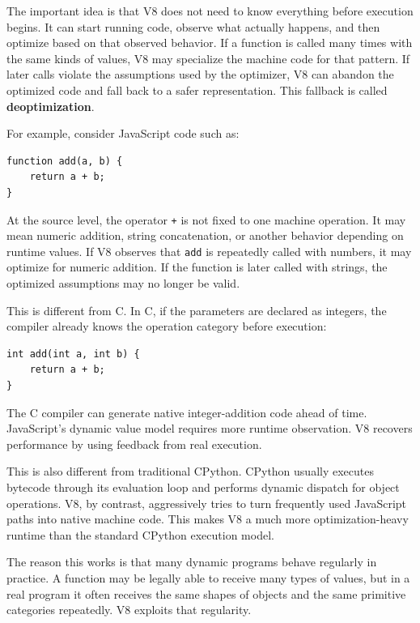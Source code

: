 The important idea is that V8 does not need to know everything before execution begins. It can start running code, observe what actually happens, and then optimize based on that observed behavior. If a function is called many times with the same kinds of values, V8 may specialize the machine code for that pattern. If later calls violate the assumptions used by the optimizer, V8 can abandon the optimized code and fall back to a safer representation. This fallback is called \textbf{deoptimization}.

For example, consider JavaScript code such as:

\begin{verbatim}
function add(a, b) {
    return a + b;
}
\end{verbatim}

At the source level, the operator \texttt{+} is not fixed to one machine operation. It may mean numeric addition, string concatenation, or another behavior depending on runtime values. If V8 observes that \texttt{add} is repeatedly called with numbers, it may optimize for numeric addition. If the function is later called with strings, the optimized assumptions may no longer be valid.

This is different from C. In C, if the parameters are declared as integers, the compiler already knows the operation category before execution:

\begin{verbatim}
int add(int a, int b) {
    return a + b;
}
\end{verbatim}

The C compiler can generate native integer-addition code ahead of time. JavaScript's dynamic value model requires more runtime observation. V8 recovers performance by using feedback from real execution.

This is also different from traditional CPython. CPython usually executes bytecode through its evaluation loop and performs dynamic dispatch for object operations. V8, by contrast, aggressively tries to turn frequently used JavaScript paths into native machine code. This makes V8 a much more optimization-heavy runtime than the standard CPython execution model.

The reason this works is that many dynamic programs behave regularly in practice. A function may be legally able to receive many types of values, but in a real program it often receives the same shapes of objects and the same primitive categories repeatedly. V8 exploits that regularity.

